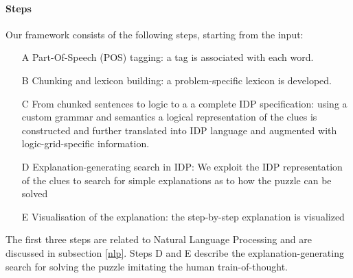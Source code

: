 \paragraph{Steps} Our framework consists of the following steps, starting from the input:
\begin{enumerate}
	\item[A] \label{steps_A} Part-Of-Speech (POS) tagging: a tag is associated with each word.\\
	\item[B] \label{steps_B} Chunking and lexicon building: a problem-specific lexicon is developed. \\
	
		\item[C] \label{steps_C} From chunked sentences to logic to a a complete IDP specification: using a custom grammar and semantics a logical representation of the clues is constructed and further translated into IDP language and augmented with logic-grid-specific information.\\
	
		\item[D] \label{steps_D} Explanation-generating search in IDP: We exploit the IDP representation of the clues to search for simple explanations as to how the puzzle can be solved\\
	\item[E] \label{steps_E} Visualisation of the explanation: the step-by-step explanation is visualized
	
\end{enumerate}
The first three steps are related to Natural Language Processing and are discussed in subsection \ref{nlp}.%
Steps D and E describe the explanation-generating search for solving the puzzle imitating the human train-of-thought.


